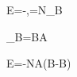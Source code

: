 \mathcal E=-,\qquad \Lambda=N\Phi_B

\Phi_B=BA\cos\theta

\mathcal E=-NA\left(\dot B\cos\theta-B\dot\theta\sin\theta\right)
